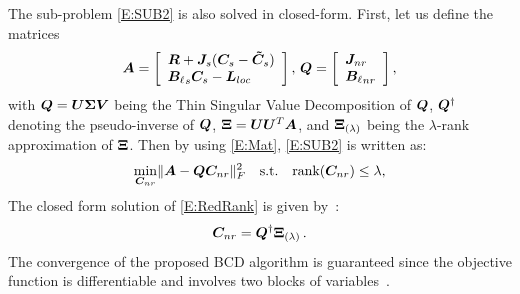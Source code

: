 The sub-problem \cref{E:SUB2} is also solved in closed-form. First, let us define the matrices
\begin{equation}\label{E:Mat}
    \boldsymbol{A}=
        \left[
            \begin{array}{l}
               \boldsymbol{R} + \boldsymbol{J}_{s} (\boldsymbol{C}_{s} - \boldsymbol{\tilde{C}}_{s}) \\
               {\boldsymbol{B}_\ell}_{s} \boldsymbol{C}_{s} - \boldsymbol{L}_{loc}
            \end{array}
        \right],\,
    \boldsymbol{Q}=
        \left[
            \begin{array}{l}
                \boldsymbol{J}_{nr} \\
                {\boldsymbol{B}_{\ell}}_{nr}
            \end{array}
        \right],
\end{equation}
with $\boldsymbol{Q} = \boldsymbol{U}\boldsymbol{\Sigma}\boldsymbol{V}$ being the
Thin Singular Value Decomposition of $\boldsymbol{Q}$,
$\boldsymbol{Q}^{\dag}$ denoting the pseudo-inverse of $\boldsymbol{Q}$,
$\boldsymbol{\Xi} = \boldsymbol{U}\boldsymbol{U}^T\boldsymbol{A}$, and $\boldsymbol{\Xi}_{(\lambda)}$ being the
$\lambda$-rank approximation of $\boldsymbol{\Xi}$.
Then by using \cref{E:Mat},  \cref{E:SUB2} is written as:
\begin{equation}\label{E:RedRank}
    \min_{\boldsymbol{C}_{nr}} \lVert{} \boldsymbol{A}  - \boldsymbol{Q} \boldsymbol{C}_{nr} \rVert_F^2 \quad \mbox{s.t.} \quad  \mbox{rank}(\boldsymbol{C}_{nr}) \leq \lambda,
\end{equation}
The closed form solution of \cref{E:RedRank} is given by~\cite{sondermann1986best}:
\begin{equation}
    \boldsymbol{C}_{nr}  = \boldsymbol{Q}^{\dag}\boldsymbol{\Xi}_{(\lambda)}  \,.
\end{equation}
The convergence of the proposed BCD algorithm is guaranteed since the objective function
is differentiable and involves two blocks of variables~\cite{luo1992convergence}.
